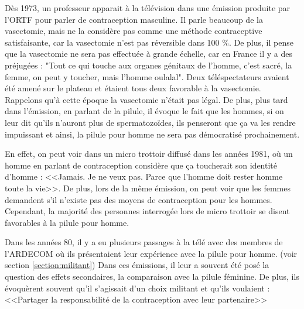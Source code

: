 \documentclass[12pt,a4paper]{report}
\begin{document}
Dès 1973, un professeur apparait à la télévision dans une émission produite par l'ORTF pour parler de contraception masculine. Il parle beaucoup de la vasectomie, mais ne la considère pas comme une méthode contraceptive satisfaisante, car la vasectomie n'est pas réversible dans 100 \%. De plus, il pense que la vasectomie ne sera pas effectuée à grande échelle, car en France il y a des préjugées : "Tout ce qui touche aux organes génitaux de l'homme, c'est sacré, la femme, on peut y toucher, mais l'homme oulalal". Deux téléspectateurs avaient été amené sur le plateau et étaient tous deux favorable à la vasectomie. \cite{ProfesseurNetterContraception} Rappelons qu'à cette époque la vasectomie n'était pas légal. \cite{guillaumedaudinContraceptesEnqueteDernier2022} De plus, plus tard dans l'émission, en parlant de la pilule, il évoque le fait que les hommes, si on leur dit qu'ils n'auront plus de spermatozoïdes, ils penseront que ça va les rendre impuissant et ainsi, la pilule pour homme ne sera pas démocratisé prochainement. \cite{inaactuPilulePourHomme2019}

En effet, on peut voir dans un micro trottoir diffusé dans les années 1981, où un homme en parlant de contraception considère que ça toucherait son identité d'homme : <<Jamais. Je ne veux pas. Parce que l'homme doit rester homme toute la vie>>. De plus, lors de la même émission, on peut voir que les femmes demandent s'il n'existe pas des moyens de contraception pour les hommes. Cependant, la majorité des personnes interrogée lors de micro trottoir se disent favorables à la pilule pour homme. \cites{MicrotrottoirHommesPour}{PilulePourHomme}

Dans les années 80, il y a eu plusieurs passages à la télé avec des membres de l'ARDECOM où ils présentaient leur expérience avec la pilule pour homme. (voir section \ref{section:militant}) Dans ces émissions, il leur a souvent été posé la question des effets secondaires, la comparaison avec la pilule féminine. De plus, ils évoquèrent souvent qu'il s'agissait d'un choix militant et qu'ils voulaient : <<Partager la responsabilité de la contraception avec leur partenaire>> \cites{inaactuPilulePourHomme2019}{1980HommeVient}
\end{document}
